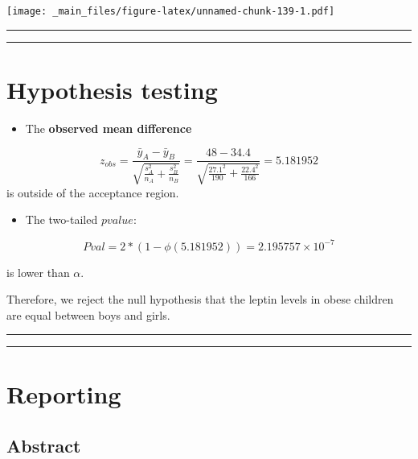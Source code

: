 \documentclass[
]{book}
\providecommand{\tightlist}{%
  \setlength{\itemsep}{0pt}\setlength{\parskip}{0pt}}
\begin{document}
\texttt{[image: \_main\_files/figure-latex/unnamed-chunk-139-1.pdf]}

\begin{center}\rule{0.5\linewidth}{0.5pt}\end{center}

\begin{center}\rule{0.5\linewidth}{0.5pt}\end{center}

\hypertarget{hypothesis-testing-1}{%
\section{Hypothesis testing}\label{hypothesis-testing-1}}

\begin{itemize}
\tightlist
\item
  The \textbf{observed mean difference}
\end{itemize}

\[z_{obs}=\frac{\bar{y}_A-\bar{y}_B }{\sqrt{\frac{s^2_A}{n_A}+\frac{s^2_B}{n_B}}}=\frac{48-34.4}{\sqrt{\frac{27.1^2}{190}+\frac{22.4^2}{166}}}=5.181952\]
is outside of the acceptance region.

\begin{itemize}
\tightlist
\item
  The two-tailed \(pvalue\):
\end{itemize}

\[Pval=2*(1-\phi(5.181952))=2.195757 \times 10^{-7}\]

is lower than \(\alpha\).

Therefore, we reject the null hypothesis that the leptin levels in obese children are equal between boys and girls.

\begin{center}\rule{0.5\linewidth}{0.5pt}\end{center}

\begin{center}\rule{0.5\linewidth}{0.5pt}\end{center}

\hypertarget{reporting}{%
\section{Reporting}\label{reporting}}

\hypertarget{abstract}{%
\subsection{Abstract}\label{abstract}}
\end{document}
